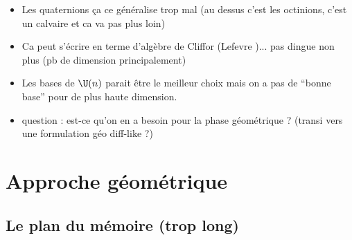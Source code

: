 \begin{itemize}
	\item Les quaternions ça ce généralise trop mal (au dessus c'est les octinions, c'est un calvaire et ca va pas plus loin)
	
	\item Ca peut s'écrire en terme d'algèbre de Cliffor (Lefevre \cite{lefevre_polarization_2021})... pas dingue non plus (pb de dimension principalement)
	
	\item Les bases de $\U(n)$ parait être le meilleur choix mais on a pas de ``bonne base'' pour de plus haute dimension.
	
	\item question : est-ce qu'on en a besoin pour la phase géométrique ? (transi vers une formulation géo diff-like ?)
\end{itemize}




\section{Approche géométrique}

\subsection{Le plan du mémoire (trop long)}

